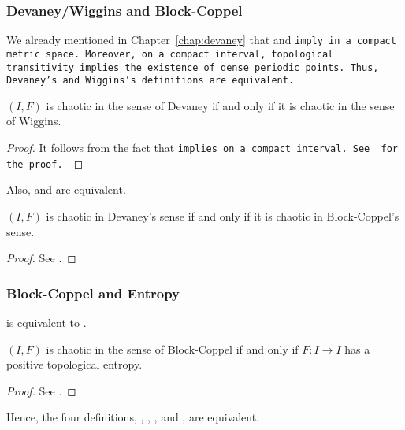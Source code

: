 \documentclass[10pt,twoside,draft]{book}
\begin{document}
\subsubsection*{Devaney/Wiggins and Block-Coppel}
We already mentioned in Chapter~\ref{chap:devaney} that \dpp and \tt imply \sdic in a compact metric space.
Moreover, on a compact interval, topological transitivity implies the existence of dense periodic points.
Thus, Devaney's and Wiggins's definitions are equivalent.
\begin{theorem}
  $(I,F)$ is chaotic in the sense of Devaney if and only if it is chaotic in the sense of Wiggins.
  \label{thm:dev-wig}
  \begin{proof}
    It follows from the fact that \tt implies \dpp on a compact interval.
    See \citet{silverman} for the proof.
  \end{proof}
\end{theorem}
Also, \dev and \blcp are equivalent.
\begin{theorem}
  $(I,F)$ is chaotic in Devaney's sense if and only if it is chaotic in Block-Coppel's sense.
  \begin{proof}
    See \citet{aulbach}.
  \end{proof}
  \label{thm:dev-blcp}
\end{theorem}

\subsubsection*{Block-Coppel and Entropy}
\blcp is equivalent to \akm.
\begin{theorem}
  $(I,F)$ is chaotic in the sense of Block-Coppel if and only if $F: I \to I$ has a positive topological entropy.
  \label{thm:ent-blcp}
  \begin{proof}
    See \citet[VII, Theorem 24]{blockcoppel}.
  \end{proof}
\end{theorem}
Hence, the four definitions, \dev, \wig, \blcp, and \akm, are equivalent.
\end{document}
